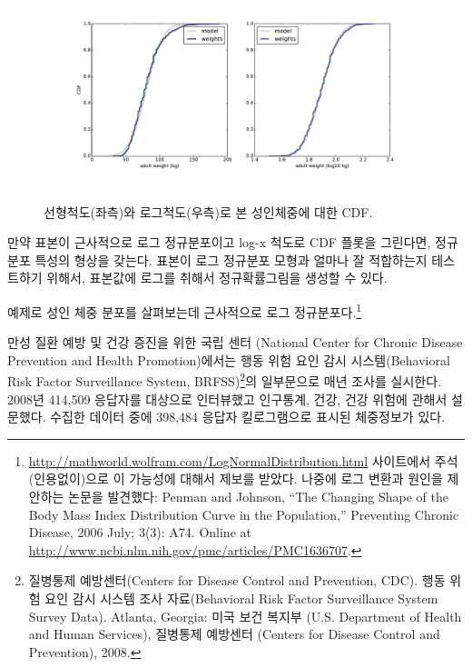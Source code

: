 \begin{figure}
\centerline{
\includegraphics[height=2.5in]{figs/brfss_weight.pdf}}
\caption{선형척도(좌측)와 로그척도(우측)로 본 성인체중에 대한 CDF.}
\label{brfss_weight}
\end{figure}

만약 표본이 근사적으로 로그 정규분포이고 log-x 척도로 CDF 플롯을 그린다면, 정규분포 특성의 형상을 갖는다.
표본이 로그 정규분포 모형과 얼마나 잘 적합하는지 테스트하기 위해서, 
표본값에 로그를 취해서 정규확률그림을 생성할 수 있다.


예제로 성인 체중 분포를 살펴보는데 근사적으로 로그 정규분포다.\footnote{\url{http://mathworld.wolfram.com/LogNormalDistribution.html} 사이트에서 주석(인용없이)으로 이 가능성에 대해서 제보를 받았다.
나중에 로그 변환과 원인을 제안하는 논문을 발견했다: Penman and Johnson, ``The Changing Shape of the Body Mass Index Distribution Curve in the Population,'' Preventing Chronic Disease, 2006 July; 3(3): A74.  Online at \url{http://www.ncbi.nlm.nih.gov/pmc/articles/PMC1636707}.}


만성 질환 예방 및 건강 증진을 위한 국립 센터 (National Center for Chronic Disease Prevention and Health Promotion)에서는 
행동 위험 요인 감시 시스템(Behavioral Risk Factor Surveillance System, BRFSS)\footnote{질병통제 예방센터(Centers for Disease Control and Prevention, CDC). 행동 위험 요인 감시 시스템 조사 자료(Behavioral Risk Factor Surveillance System Survey Data). Atlanta, Georgia: 미국 보건 복지부 (U.S. Department of Health and Human Services), 질병통제 예방센터 (Centers for Disease Control and Prevention), 2008.}의 일부문으로 매년 조사를 실시한다.
2008년 414,509 응답자를 대상으로 인터뷰했고 인구통계, 건강, 건강 위험에 관해서 설문했다. 수집한 데이터 중에 398,484 응답자 킬로그램으로 표시된 체중정보가 있다.

